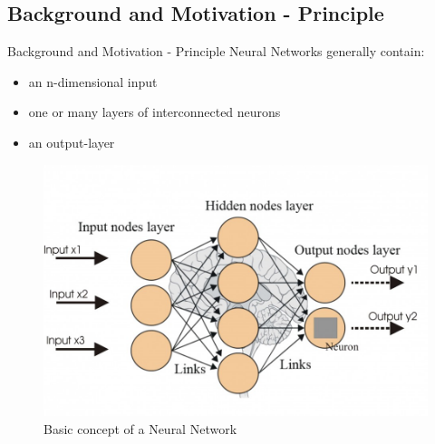 \documentclass[12pt]{beamer}
\begin{document}
\subsection{Background and Motivation - Principle}
\begin{frame}{Background and Motivation - Principle}
Neural Networks generally contain:
  \begin{itemize}
     \item an n-dimensional input 
     \item one or many layers of interconnected neurons
     \item an output-layer
  \end{itemize}
\begin{figure}
\centering
\includegraphics[width=0.5\linewidth]{images/principle.jpg}
\caption{Basic concept of a Neural Network}
\label{fig:principle}

\end{figure}

\end{frame}
\end{document}
